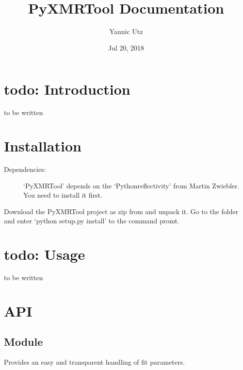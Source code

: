 \documentclass[letterpaper,10pt,english]{sphinxmanual}
\title{PyXMRTool Documentation}
\date{Jul 20, 2018}
\author{Yannic Utz}
\begin{document}
\maketitle
\sphinxtableofcontents
{}\label{\detokenize{index::doc}}



\chapter{todo: Introduction}
\label{\detokenize{intro:todo-introduction}}\label{\detokenize{intro::doc}}
to be written


\chapter{Installation}
\label{\detokenize{install:installation}}\label{\detokenize{install::doc}}\begin{description}
\item[{Dependencies:}] \leavevmode
‘PyXMRTool’ depends on the ‘Pythonreflectivity’ from Martin Zwiebler.
You need to install it first.

\end{description}

Download the PyXMRTool project as zip from  and unpack it.
Go to the folder and enter ‘python setup.py install’ to the command promt.


\chapter{todo: Usage}
\label{\detokenize{usage:todo-usage}}\label{\detokenize{usage::doc}}
to be written


\chapter{API}
\label{\detokenize{api:api}}\label{\detokenize{api::doc}}

\section{Module }
\label{\detokenize{modules-api/parameters:module-Parameters}}\label{\detokenize{modules-api/parameters:module-parameters}}\label{\detokenize{modules-api/parameters::doc}}
Provides an easy and transparent handling of fit parameters.
\end{document}

